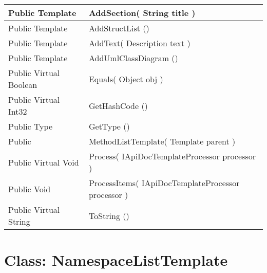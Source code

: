 \documentclass[11pt, oneside, a4paper]{book}
\begin{document}
\begin{center}
\begin{tabular}{| p{3cm} | p{12cm} | }
\hline
 Public  Template &  AddSection(\hypertarget{SoftwareEngineeringTools.{}Documentation.{}MethodListTemplate.{}AddSection\_String}{} String  title  )\\
\hline
 Public  Template &  AddStructList ()\hypertarget{SoftwareEngineeringTools.{}Documentation.{}MethodListTemplate.{}AddStructList}{}\\
\hline
 Public  Template &  AddText(\hypertarget{SoftwareEngineeringTools.{}Documentation.{}MethodListTemplate.{}AddText\_Description}{} Description  text  )\\
\hline
 Public  Template &  AddUmlClassDiagram ()\hypertarget{SoftwareEngineeringTools.{}Documentation.{}MethodListTemplate.{}AddUmlClassDiagram}{}\\
\hline
 Public  Virtual  Boolean &  Equals(\hypertarget{SoftwareEngineeringTools.{}Documentation.{}MethodListTemplate.{}Equals\_Object}{} Object  obj  )\\
\hline
 Public  Virtual  Int32 &  GetHashCode ()\hypertarget{SoftwareEngineeringTools.{}Documentation.{}MethodListTemplate.{}GetHashCode}{}\\
\hline
 Public  Type &  GetType ()\hypertarget{SoftwareEngineeringTools.{}Documentation.{}MethodListTemplate.{}GetType}{}\\
\hline
 Public  &  MethodListTemplate(\hypertarget{SoftwareEngineeringTools.{}Documentation.{}MethodListTemplate.{}MethodListTemplate\_Template}{} Template  parent  )\\
\hline
 Public  Virtual  Void &  Process(\hypertarget{SoftwareEngineeringTools.{}Documentation.{}MethodListTemplate.{}Process\_IApiDocTemplateProcessor}{} IApiDocTemplateProcessor  processor  )\\
\hline
 Public  Void &  ProcessItems(\hypertarget{SoftwareEngineeringTools.{}Documentation.{}MethodListTemplate.{}ProcessItems\_IApiDocTemplateProcessor}{} IApiDocTemplateProcessor  processor  )\\
\hline
 Public  Virtual  String &  ToString ()\hypertarget{SoftwareEngineeringTools.{}Documentation.{}MethodListTemplate.{}ToString}{}\\
\hline
\end{tabular}
\end{center}
 


\hypertarget{SoftwareEngineeringTools.{}Documentation.{}NamespaceListTemplate}{}
\section{Class: NamespaceListTemplate}
\end{document}
